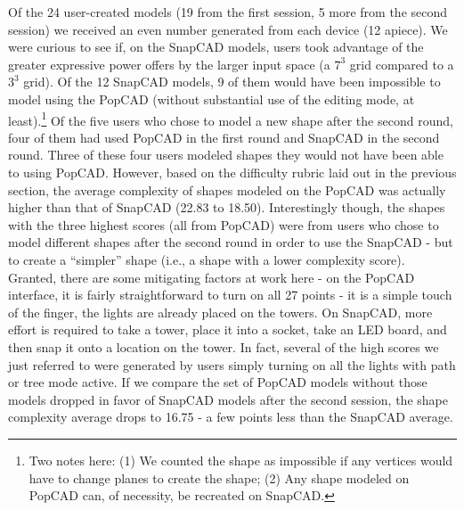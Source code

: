 Of the 24 user-created models (19 from the first session, 5 more from the second
session) we received an even number generated from each device (12 apiece). We
were curious to see if, on the SnapCAD models, users took advantage of the
greater expressive power offers by the larger input space (a $7^3$ grid compared
to a $3^3$ grid). Of the 12 SnapCAD models, 9 of them would have been impossible
to model using the PopCAD (without substantial use of the editing mode, at
least).\footnote{Two notes here: (1) We counted the shape as impossible if any
vertices would have to change planes to create the shape; (2) Any shape modeled
on PopCAD can, of necessity, be recreated on SnapCAD.} Of the five users who
chose to model a new shape after the second round, four of them had used PopCAD
in the first round and SnapCAD in the second round.
Three of these four users modeled shapes they would not have been able to using
PopCAD. However, based on the difficulty rubric laid out in the previous
section, the average complexity of shapes modeled on the PopCAD was actually
higher than that of SnapCAD (22.83 to 18.50). Interestingly though, the shapes
with the three highest scores (all from PopCAD) were from users who chose to
model different shapes after the second round in order to use the SnapCAD - but
to create a ``simpler'' shape (i.e., a shape with a lower complexity score).
Granted, there are some mitigating factors at work here - on the PopCAD
interface, it is fairly straightforward to turn on all 27 points - it is a
simple touch of the finger, the lights are already placed on the towers. On
SnapCAD, more effort is required to take a tower, place it into a socket, take
an LED board, and then snap it onto a location on the tower. In fact, several of
the high scores we just referred to were generated by users simply turning on
all the lights with path or tree mode active. If we compare the set of PopCAD
models without those models dropped in favor of SnapCAD models after the second
session, the shape complexity average drops to 16.75 - a few points less than
the SnapCAD average.

